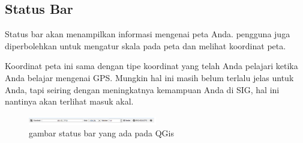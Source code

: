 \subsection{Status Bar}
Status bar akan menampilkan informasi mengenai peta Anda. pengguna juga diperbolehkan untuk mengatur skala pada peta dan melihat koordinat peta.

Koordinat peta ini sama dengan tipe koordinat yang telah Anda pelajari ketika Anda belajar mengenai GPS.
Mungkin hal ini masih belum terlalu jelas untuk Anda, tapi seiring dengan meningkatnya kemampuan Anda di SIG, hal ini nantinya akan terlihat masuk akal.
\begin{figure}[ht]
    \centerline{\includegraphics[width=0.5\textwidth]{figures/statbar}}
    \caption{gambar status bar yang ada pada QGis}
    \label{statbar}
    \end{figure}

